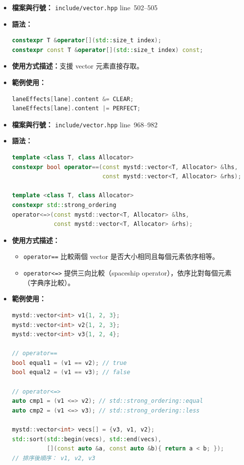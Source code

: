\documentclass[a4paper,12pt]{article}
\begin{document}
\begin{itemize}
\item \textbf{檔案與行號：} \verb|include/vector.hpp| line~502--505
\item \textbf{語法：}
\begin{lstlisting}[language=C++]
constexpr T &operator[](std::size_t index);
constexpr const T &operator[](std::size_t index) const;
\end{lstlisting}
\item \textbf{使用方式描述：}支援 vector 元素直接存取。
\item \textbf{範例使用：}
\begin{lstlisting}[language=C++]
laneEffects[lane].content &= CLEAR;
laneEffects[lane].content |= PERFECT;
\end{lstlisting}
\end{itemize}
\begin{itemize}
\item \textbf{檔案與行號：} \verb|include/vector.hpp| line~968--982
\item \textbf{語法：}
\begin{lstlisting}[language=C++]
template <class T, class Allocator>
constexpr bool operator==(const mystd::vector<T, Allocator> &lhs,
                          const mystd::vector<T, Allocator> &rhs);

template <class T, class Allocator>
constexpr std::strong_ordering
operator<=>(const mystd::vector<T, Allocator> &lhs,
            const mystd::vector<T, Allocator> &rhs);
\end{lstlisting}
\item \textbf{使用方式描述：}
\begin{itemize}
  \item \verb|operator==| 比較兩個 vector 是否大小相同且每個元素依序相等。
  \item \verb|operator<=>| 提供三向比較（spaceship operator），依序比對每個元素（字典序比較）。
\end{itemize}
\item \textbf{範例使用：}
\begin{lstlisting}[language=C++]
mystd::vector<int> v1{1, 2, 3};
mystd::vector<int> v2{1, 2, 3};
mystd::vector<int> v3{1, 2, 4};

// operator==
bool equal1 = (v1 == v2); // true
bool equal2 = (v1 == v3); // false

// operator<=>
auto cmp1 = (v1 <=> v2); // std::strong_ordering::equal
auto cmp2 = (v1 <=> v3); // std::strong_ordering::less

mystd::vector<int> vecs[] = {v3, v1, v2};
std::sort(std::begin(vecs), std::end(vecs),
          [](const auto &a, const auto &b){ return a < b; });
// 排序後順序： v1, v2, v3
\end{lstlisting}
\end{itemize}
\end{document}
